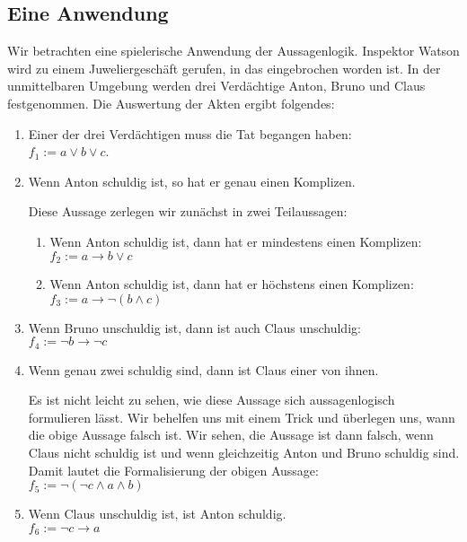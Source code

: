 \subsection{Eine Anwendung}
Wir betrachten eine spielerische Anwendung der Aussagenlogik.  Inspektor Watson wird zu
einem Juweliergesch\"{a}ft gerufen, in das eingebrochen worden ist.
In der unmittelbaren Umgebung werden drei Verd\"{a}chtige Anton, Bruno und Claus festgenommen.
Die Auswertung der Akten ergibt folgendes:
\begin{enumerate}
\item Einer der drei Verd\"{a}chtigen muss die Tat begangen haben: \\[0.2cm]
      \hspace*{1.3cm} 
      $f_1 := a \vee b \vee c$.
\item Wenn Anton schuldig ist, so hat er genau einen Komplizen. 

      Diese Aussage zerlegen wir zun\"{a}chst in zwei Teilaussagen:
      \begin{enumerate}
      \item Wenn Anton schuldig ist, dann hat er mindestens einen Komplizen: \\[0.2cm]
            \hspace*{1.3cm} $f_2 := a \rightarrow b \vee c$ 
      \item Wenn Anton schuldig ist, dann hat er h\"{o}chstens einen Komplizen: \\[0.2cm]
           \hspace*{1.3cm} $f_3 := a \rightarrow \neg (b \wedge c)$
      \end{enumerate}
\item Wenn Bruno unschuldig ist, dann ist auch Claus unschuldig: \\[0.2cm]
      \hspace*{1.3cm} $f_4 :=  \neg b \rightarrow \neg c$ 
\item Wenn genau zwei schuldig sind, dann ist Claus einer von ihnen.

      Es ist nicht leicht zu sehen, wie diese Aussage sich aussagenlogisch
      formulieren l\"{a}sst.  Wir behelfen uns mit einem Trick und \"{u}berlegen uns, wann die
      obige Aussage falsch ist.  Wir sehen, die Aussage ist dann falsch,
      wenn Claus nicht schuldig ist und wenn gleichzeitig Anton und Bruno schuldig sind.
      Damit lautet die Formalisierung der obigen Aussage: \\[0.2cm]
      \hspace*{1.3cm} $f_5 := \neg ( \neg c  \wedge a \wedge b )$ 
\item Wenn Claus unschuldig ist, ist Anton schuldig. \\[0.2cm]
      \hspace*{1.3cm} $f_6 := \neg c \rightarrow a$
\end{enumerate}
